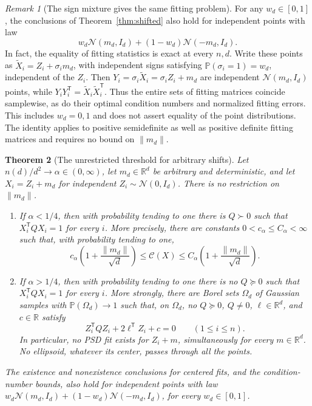 \documentclass[11pt]{article}
\newcommand{\R}{\mathbb R}
\newcommand{\Pbb}{\mathbb P}
\newcommand{\norm}[1]{\lVert#1\rVert}
\newcommand{\Copt}{\mathcal C}
\newtheorem{theorem}{Theorem}[section]
\theoremstyle{remark}
\newtheorem{remark}[theorem]{Remark}
\begin{document}
\begin{remark}[The sign mixture gives the same fitting problem]
\label{rem:sign-invariance}
For any $w_d\in[0,1]$, the conclusions of Theorem~\ref{thm:shifted} also
hold for independent points with law
\[
 w_d\mathcal N(m_d,I_d)+(1-w_d)\mathcal N(-m_d,I_d).
\]
In fact, the equality of fitting statistics is exact at every $n,d$.
Write these points as $\widetilde X_i=Z_i+\sigma_i m_d$, with independent
signs satisfying $\Pbb(\sigma_i=1)=w_d$, independent of the $Z_i$.
Then $Y_i=\sigma_i\widetilde X_i=\sigma_i Z_i+m_d$ are independent
$\mathcal N(m_d,I_d)$ points, while
$Y_iY_i^{\mathsf T}=\widetilde X_i\widetilde X_i^{\mathsf T}$.
Thus the entire sets of fitting matrices coincide samplewise, as do
their optimal condition numbers and normalized fitting errors. This
includes $w_d=0,1$ and does not
assert equality of the point distributions. The identity applies to
positive semidefinite as well as positive definite fitting matrices and
requires no bound on $\norm{m_d}$.
\end{remark}

\begin{theorem}[The unrestricted threshold for arbitrary shifts]
\label{thm:unrestricted}
Let $n(d)/d^2\to\alpha\in(0,\infty)$, let $m_d\in\R^d$ be arbitrary
and deterministic, and let $X_i=Z_i+m_d$ for independent
$Z_i\sim\mathcal N(0,I_d)$. There is no restriction on $\norm{m_d}$.
\begin{enumerate}
\item If $\alpha<1/4$, then with probability tending to one there is
      $Q\succ0$ such that $X_i^{\mathsf T}QX_i=1$ for every $i$.
      More precisely, there are constants $0<c_\alpha\le C_\alpha<\infty$
      such that, with probability tending to one,
      \begin{equation}\label{eq:condition-growth}
       c_\alpha\left(1+\frac{\norm{m_d}}{\sqrt d}\right)
       \le\Copt(X)\le
       C_\alpha\left(1+\frac{\norm{m_d}}{\sqrt d}\right).
      \end{equation}
\item If $\alpha>1/4$, then with probability tending to one there is
      no $Q\succeq0$ such that $X_i^{\mathsf T}QX_i=1$ for every $i$.
      More strongly, there are Borel sets $\Omega_d$ of Gaussian samples
      with $\Pbb(\Omega_d)\to1$ such that, on $\Omega_d$, no
      $Q\succeq0$, $Q\ne0$, $\ell\in\R^d$, and $c\in\R$ satisfy
      \begin{equation}\label{eq:no-quadric}
       Z_i^{\mathsf T}QZ_i+2\ell^{\mathsf T}Z_i+c=0
       \qquad(1\le i\le n).
      \end{equation}
      In particular, no PSD fit exists for $Z_i+m$, simultaneously
      for every $m\in\R^d$. No ellipsoid, whatever its center, passes
      through all the points.
\end{enumerate}
The existence and nonexistence conclusions for centered fits, and the
condition-number bounds, also hold for independent points with law
$w_d\mathcal N(m_d,I_d)+(1-w_d)\mathcal N(-m_d,I_d)$, for every
$w_d\in[0,1]$.
\end{theorem}
\end{document}
